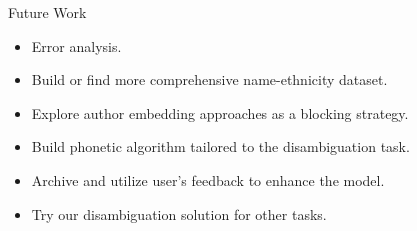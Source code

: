 \documentclass{beamer}
\begin{document}
\begin{frame}{Future Work}

\begin{itemize}

\item Error analysis.\\[1em]

\item Build or find more comprehensive name-ethnicity dataset. \\[1em]

\item Explore author embedding approaches as a blocking strategy.\\[1em]

\item Build phonetic algorithm tailored to the disambiguation task. \\[1em]

\item Archive and utilize user's feedback to enhance the model. \\[1em]

\item Try our disambiguation solution for other tasks. 

\end{itemize}

\end{frame}
\end{document}
